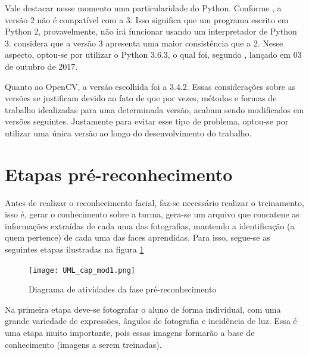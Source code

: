 Vale destacar nesse momento uma particularidade do Python. Conforme \citep{pythonLTC}, a versão 2 não é compatível com a  3. Isso significa que um programa escrito em Python 2, provavelmente, não irá funcionar usando um interpretador de Python 3. \citep{pythonLTC} considera que a versão 3 apresenta uma maior consistência que a 2. Nesse aspecto, optou-se por utilizar o Python 3.6.3, o qual foi, segundo \citep{python_org}, lançado em 03 de outubro de 2017. 
 
Quanto ao OpenCV, a versão escolhida foi a 3.4.2. Essas considerações sobre as versões se justificam devido ao fato de que por vezes, métodos e formas de trabalho idealizadas para uma determinada versão, acabam sendo modificados em versões seguintes. Justamente para evitar esse tipo de problema, optou-se por utilizar uma única versão ao longo do desenvolvimento do trabalho.
 
 
\section{Etapas pré-reconhecimento}
\noindent 
Antes de realizar o reconhecimento facial, faz-se necessário realizar o treinamento, isso é, gerar o conhecimento sobre a turma, gera-se um arquivo que concatene as informações extraídas de cada uma das fotografias, mantendo a identificação (a quem pertence) de cada uma das faces aprendidas. Para isso, segue-se as seguintes etapas ilustradas na figura \ref{fig:figura50}

\begin{figure}[!ht]
	\centering
	\texttt{[image: UML\_cap\_mod1.png]}   
	\caption{Diagrama de atividades da fase pré-reconhecimento}
	\label{fig:figura50}
\end{figure}

Na primeira etapa deve-se fotografar o aluno de forma individual, com uma grande variedade de expressões, ângulos de fotografia e incidência de luz. Essa é uma etapa muito importante, pois essas imagens formarão a base de conhecimento (imagens a serem treinadas). 

